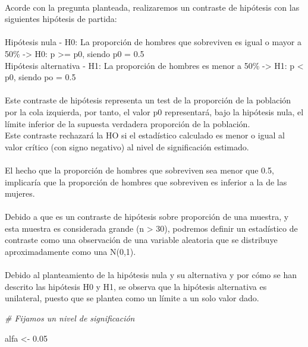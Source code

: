 \documentclass[
]{article}
\newenvironment{Shaded}{\begin{snugshade}}{\end{snugshade}}
\newcommand{\CommentTok}[1]{\textcolor[rgb]{0.56,0.35,0.01}{\textit{#1}}}
\newcommand{\FloatTok}[1]{\textcolor[rgb]{0.00,0.00,0.81}{#1}}
\newcommand{\NormalTok}[1]{#1}
\newcommand{\StringTok}[1]{\textcolor[rgb]{0.31,0.60,0.02}{#1}}
\begin{document}
\texttt{}\\
Acorde con la pregunta planteada, realizaremos un contraste de hipótesis
con las siguientes hipótesis de partida:\\
\texttt{}~\\
Hipótesis nula - H0: La proporción de hombres que sobreviven es igual o
mayor a 50\% -\textgreater{} H0: p \textgreater= p0, siendo p0 = 0.5\\
Hipótesis alternativa - H1: La proporción de hombres es menor a 50\%
-\textgreater{} H1: p \textless{} p0, siendo po = 0.5\\
\texttt{}~\\
Este contraste de hipótesis representa un test de la proporción de la
población por la cola izquierda, por tanto, el valor p0 representará,
bajo la hipótesis nula, el límite inferior de la supuesta verdadera
proporción de la población.\\
Este contraste rechazará la HO si el estadístico calculado es menor o
igual al valor crítico (con signo negativo) al nivel de significación
estimado.\\
\texttt{}~\\
El hecho que la proporción de hombres que sobreviven sea menor que 0.5,
implicaría que la proporción de hombres que sobreviven es inferior a la
de las mujeres.\\
\texttt{}~\\
Debido a que es un contraste de hipótesis sobre proporción de una
muestra, y esta muestra es considerada grande (n \textgreater{} 30),
podremos definir un estadístico de contraste como una observación de una
variable aleatoria que se distribuye aproximadamente como una N(0,1).\\
\texttt{}~\\
Debido al planteamiento de la hipótesis nula y su alternativa y por cómo
se han descrito las hipótesis H0 y H1, se observa que la hipótesis
alternativa es unilateral, puesto que se plantea como un límite a un
solo valor dado.

\texttt{}

\begin{Shaded}
\begin{Highlighting}[]
\CommentTok{# Fijamos un nivel de significación}

\NormalTok{alfa <-}\StringTok{ }\FloatTok{0.05}
\end{Highlighting}
\end{Shaded}
\end{document}
